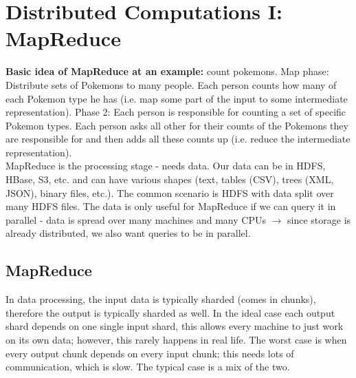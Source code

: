 \documentclass[11pt,oneside,a4paper]{article}
\begin{document}
\newpage

\section{Distributed Computations I: MapReduce}

\textbf{Basic idea of MapReduce at an example:} count pokemons. Map phase: Distribute sets of Pokemons to many people. Each person counts how many of each Pokemon type he has (i.e. map some part of the input to some intermediate representation). Phase 2: Each person is responsible for counting a set of specific Pokemon types. Each person asks all other for their counts of the Pokemons they are responsible for and then adds all these counts up (i.e. reduce the intermediate representation).\\

MapReduce is the processing stage - needs data. Our data can be in HDFS, HBase, S3, etc. and can have various shapes (text, tables (CSV), trees (XML, JSON), binary files, etc.). The common scenario is HDFS with data split over many HDFS files. The data is only useful for MapReduce if we can query it in parallel - data is spread over many machines and many CPUs $\rightarrow$ since storage is already distributed, we also want queries to be in parallel.

\subsection{MapReduce}

In data processing, the input data is typically sharded (comes in chunks), therefore the output is typically sharded as well. In the ideal case each output shard depends on one single input shard, this allows every machine to just work on its own data; however, this rarely happens in real life. The worst case is when every output chunk depends on every input chunk; this needs lots of communication, which is slow. The typical case is a mix of the two.
\end{document}
